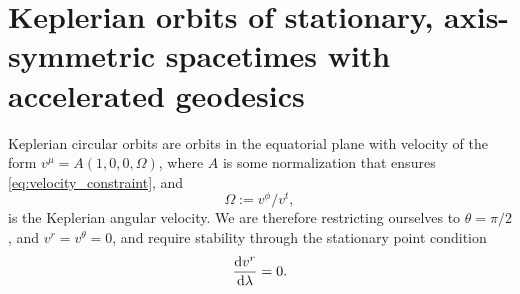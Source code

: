 \section{Keplerian orbits of stationary, axis-symmetric spacetimes with accelerated geodesics}
\label{appendix:circular-orbits}

Keplerian circular orbits are orbits in the equatorial plane with velocity of the form $v^\mu = A(1, 0, 0, \Omega)$, where $A$ is some normalization that ensures \eqref{eq:velocity_constraint}, and
\begin{equation}
    \label{eq:keplerian-angular-velocity}
    \Omega := v^\phi / v^t,
\end{equation}
is the Keplerian angular velocity. We are therefore restricting ourselves to $\theta = \pi/2$, and $v^r = v^\theta = 0$, and require stability through the stationary point condition
\begin{equation}
    \frac{\text{d} v^r}{\text{d} \lambda} = 0.
\end{equation}

